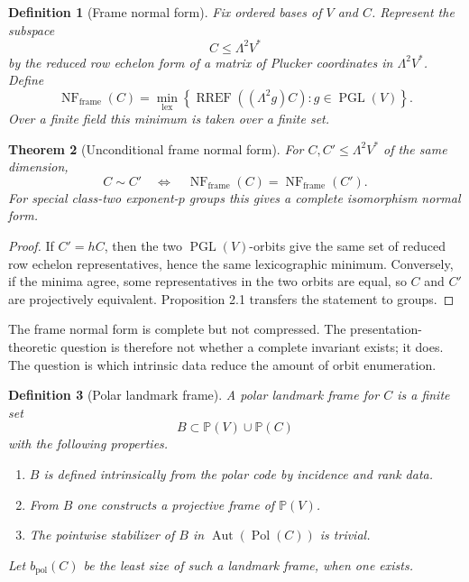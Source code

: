 \documentclass[11pt]{article}
\newtheorem{theorem}{Theorem}[section]
\newtheorem{definition}[theorem]{Definition}
\begin{document}
\begin{definition}[Frame normal form]
Fix ordered bases of $V$ and $C$. Represent the subspace
\[
C\le\Lambda^2V^*
\]
by the reduced row echelon form of a matrix of Plucker coordinates in $\Lambda^2V^*$. Define
\[
\operatorname{NF}_{\mathrm{frame}}(C)
=
\min_{\mathrm{lex}}
\left\{
\operatorname{RREF}((\Lambda^2g)C):
g\in\operatorname{PGL}(V)
\right\}.
\]
Over a finite field this minimum is taken over a finite set.
\end{definition}

\begin{theorem}[Unconditional frame normal form]
For $C,C'\le\Lambda^2V^*$ of the same dimension,
\[
C\sim C'
\quad\Longleftrightarrow\quad
\operatorname{NF}_{\mathrm{frame}}(C)
=
\operatorname{NF}_{\mathrm{frame}}(C').
\]
For special class-two exponent-$p$ groups this gives a complete isomorphism normal form.
\end{theorem}

\begin{proof}
If $C'=hC$, then the two $\operatorname{PGL}(V)$-orbits give the same set of reduced row echelon representatives, hence the same lexicographic minimum. Conversely, if the minima agree, some representatives in the two orbits are equal, so $C$ and $C'$ are projectively equivalent. Proposition 2.1 transfers the statement to groups.
\end{proof}

The frame normal form is complete but not compressed. The presentation-theoretic question is therefore not whether a complete invariant exists; it does. The question is which intrinsic data reduce the amount of orbit enumeration.

\begin{definition}[Polar landmark frame]
A polar landmark frame for $C$ is a finite set
\[
B\subset\mathbb P(V)\cup\mathbb P(C)
\]
with the following properties.
\begin{enumerate}[label=\roman*.]
\item $B$ is defined intrinsically from the polar code by incidence and rank data.
\item From $B$ one constructs a projective frame of $\mathbb P(V)$.
\item The pointwise stabilizer of $B$ in $\operatorname{Aut}(\operatorname{Pol}(C))$ is trivial.
\end{enumerate}
Let $b_{\mathrm{pol}}(C)$ be the least size of such a landmark frame, when one exists.
\end{definition}
\end{document}
